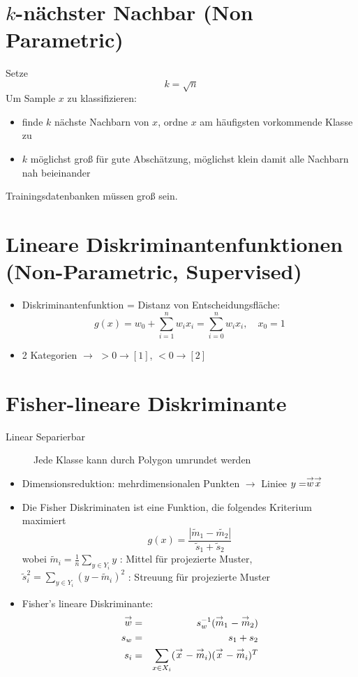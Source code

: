 \section{$k$-nächster Nachbar (Non Parametric)}

Setze $$k = \sqrt{n}$$ Um Sample $x$ zu klassifizieren:
\begin{itemize}
\item finde $k$ nächste Nachbarn von $x$, ordne $x$ am häufigsten vorkommende Klasse zu
\item $k$ möglichst groß für gute Abschätzung, möglichst klein damit alle Nachbarn nah beieinander
\end{itemize}
Trainingsdatenbanken müssen groß sein.

\section{Lineare Diskriminantenfunktionen (Non-Parametric, Supervised)}

\begin{itemize}
\item Diskriminantenfunktion = Distanz von Entscheidungsfläche: $$g(x) = w_0 + \sum\limits_{i=1}^n w_ix_i = \sum\limits_{i=0}^n w_ix_i, \quad x_0 = 1$$
\item 2 Kategorien $\to$ $>0 \rightarrow [1]$, $<0 \rightarrow [2]$
\end{itemize}

\section{Fisher-lineare Diskriminante}

\begin{description}
	\item[Linear Separierbar] Jede Klasse kann durch Polygon umrundet werden
\end{description}
\begin{itemize}
\item Dimensionsreduktion: mehrdimensionalen Punkten $\to$ Liniee $y = \stackrel{\to}{w} \stackrel{\to}{x}$
\item Die Fisher Diskriminaten ist eine Funktion, die folgendes Kriterium maximiert $$g(x) = \frac{| \tilde{m}_1 - \tilde{m_2}|}{\tilde{s}_1 + \tilde{s}_2}$$
wobei $\tilde{m}_i = \frac{1}{n} \sum\limits_{y \in Y_i} y$ : Mittel für projezierte Muster, $\tilde{s}_i^2 = \sum\limits_{y \in Y_i} (y - \tilde{m}_i)^2$ : Streuung für projezierte Muster
\item Fisher's lineare Diskriminante:
\begin{eqnarray*}
\stackrel{\to}{w} &=& s_w^{-1} (\stackrel{\to}{m}_1 - \stackrel{\to}{m}_2) \\ s_w &=& s_1 + s_2 \\ s_i &=& \sum\limits_{x \in X_i} (\stackrel{\to}{x} - \stackrel{\to}{m}_i)(\stackrel{\to}{x} - \stackrel{\to}{m}_i)^T
\end{eqnarray*}


\end{itemize}






